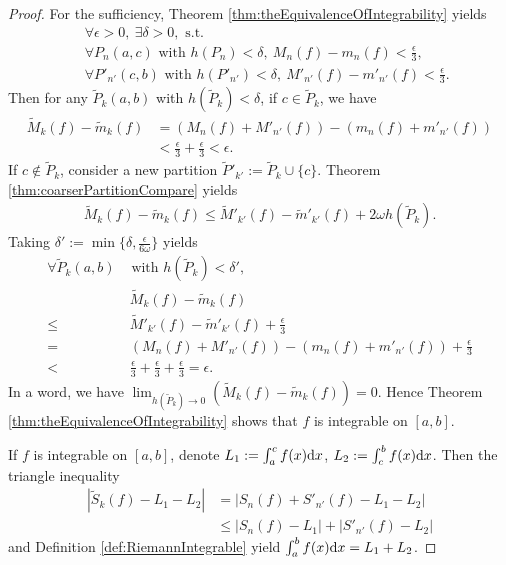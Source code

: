 \begin{proof}
  For the sufficiency,
  Theorem \ref{thm:theEquivalenceOfIntegrability} yields
  \begin{align*}
    &\ \forall\epsilon>0,\ \exists \delta>0,\text{ s.t. }\\
    &\ \forall P_{n}(a,c)\text{ with }h(P_{n})<\delta,
      \ M_{n}(f)-m_{n}(f)<\frac{\epsilon}{3},\\
    &\ \forall P'_{n'}(c,b)\text{ with }h(P'_{n'})<\delta,
      \ M'_{n'}(f)-m'_{n'}(f)<\frac{\epsilon}{3}.
  \end{align*}
  Then for any $\widetilde{P}_{k}(a,b)$ with
  $h(\widetilde{P}_{k})<\delta$,
  if $c\in \widetilde{P}_{k}$, we have
  \begin{align*}
    \widetilde{M}_{k}(f)-\widetilde{m}_{k}(f)
    &=(M_{n}(f)+M'_{n'}(f))-(m_{n}(f)+m'_{n'}(f))\\
    &<\frac{\epsilon}{3}+\frac{\epsilon}{3}<\epsilon.
  \end{align*}
  If $c\not\in \widetilde{P}_{k}$,
  consider a new partition
  $\widetilde{P}'_{k'}:=\widetilde{P}_{k}\cup \{c\}$.
  Theorem \ref{thm:coarserPartitionCompare} yields
  \begin{align*}
    \widetilde{M}_{k}(f)-\widetilde{m}_{k}(f)
    \le \widetilde{M}'_{k'}(f)-\widetilde{m}'_{k'}(f)
    +2\omega h(\widetilde{P}_{k}).
  \end{align*}
  Taking $\delta':=\min\{\delta,\frac{\epsilon}{6\omega}\}$ yields
  \begin{align*}
    \forall
    \widetilde{P}_{k}(a,b)&\text{ with }
    h(\widetilde{P}_{k})<\delta',\\
    &\ \widetilde{M}_{k}(f)-\widetilde{m}_{k}(f)\\
    \le &\ \widetilde{M}'_{k'}(f)-\widetilde{m}'_{k'}(f)
          +\frac{\epsilon}{3}\\
    =&\ (M_{n}(f)+M'_{n'}(f))-(m_{n}(f)+m'_{n'}(f))+\frac{\epsilon}{3}\\
    <&\ \frac{\epsilon}{3}+\frac{\epsilon}{3}+\frac{\epsilon}{3}
       =\epsilon.
  \end{align*}
  In a word, we have
  $\lim_{h(\widetilde{P}_{k})\rightarrow0}
  (\widetilde{M}_{k}(f)-\widetilde{m}_{k}(f))=0.$
  Hence Theorem \ref{thm:theEquivalenceOfIntegrability} shows that
  $f$ is integrable on $[a,b]$.

  If $f$ is integrable on $[a,b]$,
  denote $L_{1}:=\int_{a}^{c}f(x)\mathrm{d} x$,
  $L_{2}:=\int_{c}^{b}f(x)\mathrm{d} x$.
  Then the triangle inequality
  \begin{align*}
    |\widetilde{S}_{k}(f)-L_{1}-L_{2}|
    &= |S_{n}(f)+S'_{n'}(f)-L_{1}-L_{2}|\\
    &\le |S_{n}(f)-L_{1}|+|S'_{n'}(f)-L_{2}|
  \end{align*}
  and Definition \ref{def:RiemannIntegrable}
  yield $\int_{a}^{b}f(x)\mathrm{d} x=L_{1}+L_{2}$.
\end{proof}

